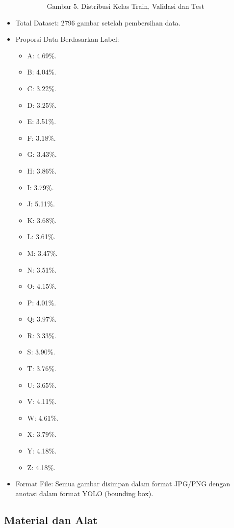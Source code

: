 \documentclass[12pt,a4paper]{article}
\begin{document}
\begin{itemize}
\begin{itemize}
\begin{figure}[h]
            \caption*{Gambar 5. Distribusi Kelas Train, Validasi dan Test}
            \label{fig:enter-label}
        \end{figure}
    \end{itemize}
    \item Total Dataset: 2796 gambar setelah pembersihan data.
    \item Proporsi Data Berdasarkan Label:
    \begin{itemize}
        \item A: 4.69\%.
        \item B: 4.04\%.
        \item C: 3.22\%.
        \item D: 3.25\%.
        \item E: 3.51\%.
        \item F: 3.18\%.
        \item G: 3.43\%.
        \item H: 3.86\%.
        \item I: 3.79\%.
        \item J: 5.11\%.
        \item K: 3.68\%.
        \item L: 3.61\%.
        \item M: 3.47\%.
        \item N: 3.51\%.
        \item O: 4.15\%.
        \item P: 4.01\%.
        \item Q: 3.97\%.
        \item R: 3.33\%.
        \item S: 3.90\%.
        \item T: 3.76\%.
        \item U: 3.65\%.
        \item V: 4.11\%.
        \item W: 4.61\%.
        \item X: 3.79\%.
        \item Y: 4.18\%.
        \item Z: 4.18\%.
    \end{itemize}
    \item Format File: Semua gambar disimpan dalam format JPG/PNG dengan anotasi dalam format YOLO (bounding box).
\end{itemize}

\subsection{Material dan Alat}
\end{document}
